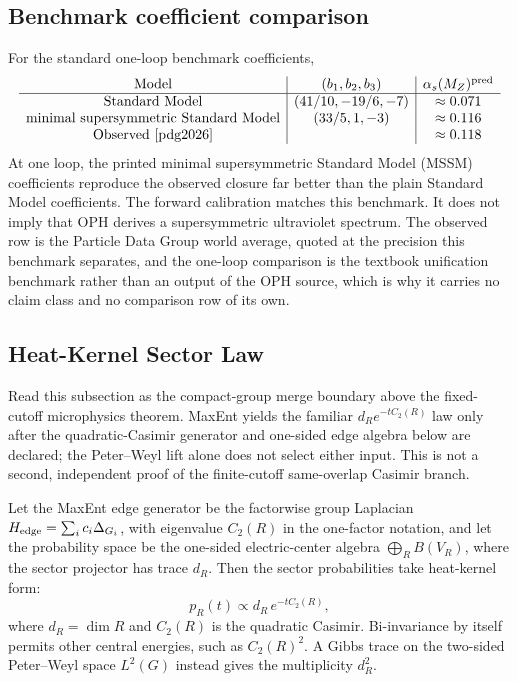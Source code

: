 \subsection{Benchmark coefficient comparison}

For the standard one-loop benchmark coefficients,
\[
\begin{array}{c|c|c}
\text{Model} & (b_1,b_2,b_3) & \alpha_s(M_Z)^{\mathrm{pred}} \\
\hline
\text{Standard Model} & (41/10,-19/6,-7) & \approx 0.071 \\
\text{minimal supersymmetric Standard Model} & (33/5,1,-3) & \approx 0.116 \\
\text{Observed \cite{pdg2026}} & & \approx 0.118
\end{array}
\]
At one loop, the printed minimal supersymmetric Standard Model (MSSM)
coefficients reproduce the observed closure far better than the plain
Standard Model coefficients. The forward calibration matches this benchmark.
It does not imply that OPH derives a supersymmetric ultraviolet spectrum.
The observed row is the Particle Data Group world average, quoted at the
precision this benchmark separates, and the one-loop comparison is the
textbook unification benchmark rather than an output of the OPH source, which
is why it carries no claim class and no comparison row of its own.

\subsection{Heat-Kernel Sector Law}

Read this subsection as the compact-group merge boundary above the fixed-cutoff microphysics
theorem. MaxEnt yields the familiar \(d_R e^{-tC_2(R)}\) law only after the
quadratic-Casimir generator and one-sided edge algebra below are declared;
the Peter--Weyl lift alone does not select either input. This is not a second,
independent proof of the finite-cutoff same-overlap Casimir branch.

\begin{theorem}
Let the MaxEnt edge generator be the factorwise group Laplacian
\(H_{\rm edge}=\sum_i c_i\Delta_{G_i}\), with eigenvalue
\(C_2(R)\) in the one-factor notation, and let the probability space be the
one-sided electric-center algebra \(\bigoplus_R B(V_R)\), where the sector
projector has trace \(d_R\). Then the sector probabilities take heat-kernel
form:
\[
p_R(t)\propto d_R\,e^{-tC_2(R)},
\]
where \(d_R=\dim R\) and \(C_2(R)\) is the quadratic Casimir.
Bi-invariance by itself permits other central energies, such as
\(C_2(R)^2\). A Gibbs trace on the two-sided Peter--Weyl space \(L^2(G)\)
instead gives the multiplicity \(d_R^2\).
\end{theorem}

